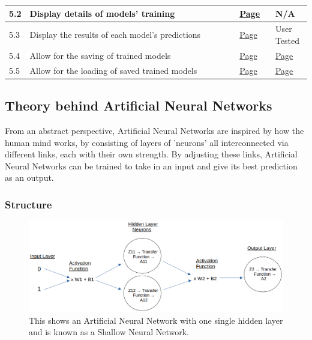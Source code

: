 \documentclass[./project-report/src/latex/project-report.tex]{subfiles}
\begin{document}
\begin{tabular}{|p{0.03\linewidth}|p{0.73\linewidth}|p{0.12\linewidth}|p{0.12\linewidth}|}
      \hline
      5.2 & Display details of models' training & \hyperref[sec:create_model-module]{Page \pageref{sec:create_model-module}} & N/A \\
      \hline
      5.3 & Display the results of each model's predictions & \hyperref[sec:test_model-module]{Page \pageref{sec:test_model-module}} & User Tested \\
      \hline
      5.4 & Allow for the saving of trained models & \hyperref[sec:test_model-module]{Page \pageref{sec:test_model-module}} & \hyperref[sec:test-frames-input-validation]{Page \pageref{sec:test-frames-input-validation}} \\
      \hline
      5.5 & Allow for the loading of saved trained models & \hyperref[sec:load_model-module]{Page \pageref{sec:load_model-module}} & \hyperref[sec:load-model-frame-input-validation]{Page \pageref{sec:load-model-frame-input-validation}} \\
      \hline
\end{tabular}

\subsection{Theory behind Artificial Neural Networks}
\label{sec:ann-theory}

From an abstract perspective, Artificial Neural Networks are inspired by how the human mind works, by consisting of layers of 'neurons' all interconnected via 
different links, each with their own strength. By adjusting these links, Artificial Neural Networks can be trained to take in an input and give its best 
prediction as an output.
\vspace{5mm}

\subsubsection{Structure}

\begin{figure}[h!]
\centering
\includegraphics[width=1\textwidth]{./project-report/src/images/shallow-ann-diagram.png}
\caption{This shows an Artificial Neural Network with one single hidden layer and is known as a Shallow Neural Network.}
\end{figure}
\end{document}
